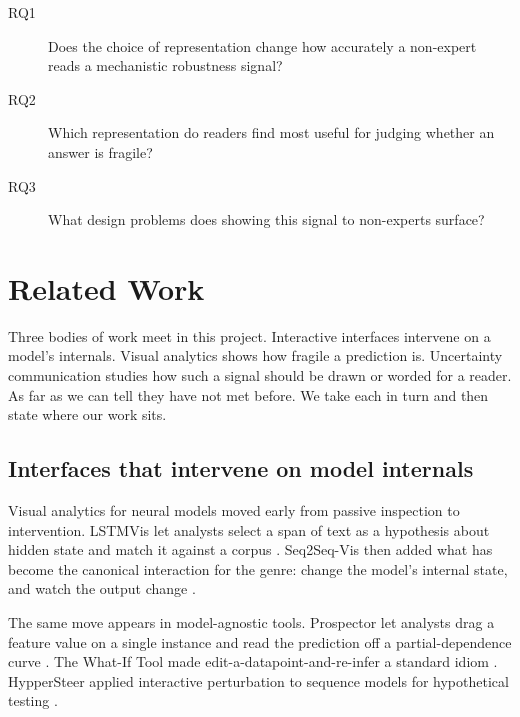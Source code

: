 \documentclass[sigconf]{acmart}
\begin{document}
\begin{description}
  \item[RQ1] Does the choice of representation change how accurately a non-expert reads a mechanistic
    robustness signal?
  \item[RQ2] Which representation do readers find most useful for judging whether an answer is fragile?
  \item[RQ3] What design problems does showing this signal to non-experts surface?
\end{description}

\section{Related Work}

Three bodies of work meet in this project. Interactive interfaces intervene on a model's internals. Visual
analytics shows how fragile a prediction is. Uncertainty communication studies how such a signal should be
drawn or worded for a reader. As far as we can tell they have not met before. We take each in turn and then
state where our work sits.

\subsection{Interfaces that intervene on model internals}

Visual analytics for neural models moved early from passive inspection to intervention. LSTMVis let analysts
select a span of text as a hypothesis about hidden state and match it against a corpus
\cite{strobeltLSTMVisToolVisual2016}. Seq2Seq-Vis then added what has become the canonical interaction for the
genre: change the model's internal state, and watch the output change
\cite{strobeltSeq2SeqVisVisualDebugging2018}.

The same move appears in model-agnostic tools. Prospector let analysts drag a feature value on a single
instance and read the prediction off a partial-dependence curve \cite{krauseInteractingPredictionsVisual2016}.
The What-If Tool made edit-a-datapoint-and-re-infer a standard idiom \cite{wexlerWhatIfToolInteractive2019}.
HypperSteer applied interactive perturbation to sequence models for hypothetical testing
\cite{wangHypperSteerHypotheticalSteering2020}.
\end{document}
